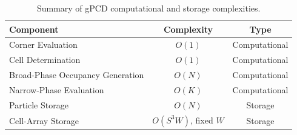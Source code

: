 \begin{table}[h!]
\centering
\caption{Summary of gPCD computational and storage complexities.}
\label{tab:ComplexityTable}
\begin{tabular}{lcc}
\hline
Component & Complexity & Type \\
\hline
Corner Evaluation & $O(1)$ & Computational \\
Cell Determination & $O(1)$ & Computational \\
Broad-Phase Occupancy Generation & $O(N)$ & Computational \\
Narrow-Phase Evaluation & $O(K)$ & Computational \\
Particle Storage & $O(N)$ & Storage \\
Cell-Array Storage & $O(S^3W)$, fixed $W$ & Storage\\
\hline
\end{tabular}
\end{table}
